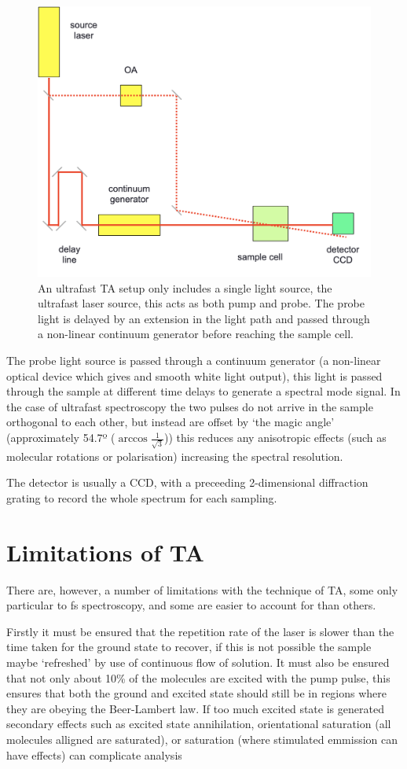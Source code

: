 \documentclass[
]{book}
\begin{document}
\begin{figure}

{\centering \includegraphics[width=0.6\linewidth]{images/fssetup} 

}

\caption{An ultrafast TA setup only includes a single light source, the ultrafast laser source, this acts as both pump and probe. The probe light is delayed by an extension in the light path and passed through a non-linear continuum generator before reaching the sample cell.}\label{fig:fssetup}
\end{figure}

The probe light source is passed through a continuum generator (a non-linear optical device which gives and smooth white light output), this light is passed through the sample at different time delays to generate a spectral mode signal. In the case of ultrafast spectroscopy the two pulses do not arrive in the sample orthogonal to each other, but instead are offset by `the magic angle' (approximately 54.7º (\(\arccos \frac{1}{\sqrt{3}}\))) this reduces any anisotropic effects (such as molecular rotations or polarisation) increasing the spectral resolution.

The detector is usually a CCD, with a preceeding 2-dimensional diffraction grating to record the whole spectrum for each sampling.

\hypertarget{limitations-of-ta}{%
\section{Limitations of TA}\label{limitations-of-ta}}

There are, however, a number of limitations with the technique of TA, some only particular to fs spectroscopy, and some are easier to account for than others.

Firstly it must be ensured that the repetition rate of the laser is slower than the time taken for the ground state to recover, if this is not possible the sample maybe `refreshed' by use of continuous flow of solution. It must also be ensured that not only about 10\% of the molecules are excited with the pump pulse, this ensures that both the ground and excited state should still be in regions where they are obeying the Beer-Lambert law. If too much excited state is generated secondary effects such as excited state annihilation, orientational saturation (all molecules alligned are saturated), or saturation (where stimulated emmission can have effects) can complicate analysis
\end{document}
